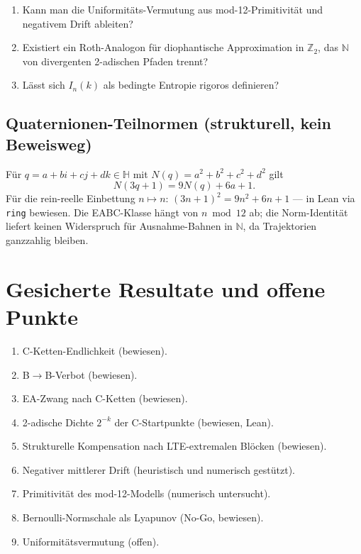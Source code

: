 \documentclass[12pt,a4paper]{article}
\newcommand{\N}{\mathbb{N}}
\newcommand{\Ztwo}{\mathbb{Z}_2}
\begin{document}
\begin{enumerate}
  \item Kann man die Uniformitäts-Vermutung aus mod-12-Primitivität
    und negativem Drift ableiten?
  \item Existiert ein Roth-Analogon für diophantische Approximation
    in $\Ztwo$, das $\N$ von divergenten 2-adischen Pfaden trennt?
  \item Lässt sich $I_n(k)$ als bedingte Entropie rigoros definieren?
\end{enumerate}

\subsection{Quaternionen-Teilnormen (strukturell, kein Beweisweg)}

Für $q = a + bi + cj + dk \in \mathbb{H}$ mit $N(q) = a^2+b^2+c^2+d^2$ gilt
\[
  N(3q+1) = 9N(q) + 6a + 1.
\]
Für die rein-reelle Einbettung $n \mapsto n$:
$(3n+1)^2 = 9n^2 + 6n + 1$ --- in Lean via \texttt{ring} bewiesen.
Die EABC-Klasse hängt von $n \bmod 12$ ab; die Norm-Identität liefert
keinen Widerspruch für Ausnahme-Bahnen in $\N$, da Trajektorien
ganzzahlig bleiben.

\section{Gesicherte Resultate und offene Punkte}
\label{sec:resultate}

\begin{enumerate}
\item C-Ketten-Endlichkeit (bewiesen).
\item B$\to$B-Verbot (bewiesen).
\item EA-Zwang nach C-Ketten (bewiesen).
\item 2-adische Dichte $2^{-k}$ der C-Startpunkte (bewiesen, Lean).
\item Strukturelle Kompensation nach LTE-extremalen Blöcken (bewiesen).
\item Negativer mittlerer Drift (heuristisch und numerisch gestützt).
\item Primitivität des mod-12-Modells (numerisch untersucht).
\item Bernoulli-Normschale als Lyapunov (No-Go, bewiesen).
\item Uniformitätsvermutung (offen).
\end{enumerate}
\end{document}
